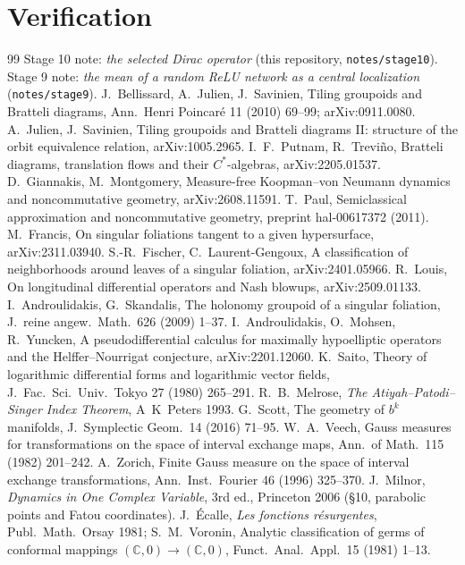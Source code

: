 \documentclass[11pt]{article}
\theoremstyle{plain}
\theoremstyle{definition}\newtheorem{definition}[theorem]{Definition}\newtheorem{remark}[theorem]{Remark}
\begin{document}
\section*{Verification}

\begin{thebibliography}{99}\small
{} Stage 10 note: \emph{the selected Dirac operator} (this repository, \texttt{notes/stage10}).
 Stage 9 note: \emph{the mean of a random ReLU network as a central localization} (\texttt{notes/stage9}).
 J.~Bellissard, A.~Julien, J.~Savinien, Tiling groupoids and Bratteli diagrams, Ann.~Henri Poincar\'e 11 (2010) 69--99; arXiv:0911.0080.
 A.~Julien, J.~Savinien, Tiling groupoids and Bratteli diagrams II: structure of the orbit equivalence relation, arXiv:1005.2965.
 I.~F.~Putnam, R.~Trevi\~no, Bratteli diagrams, translation flows and their $C^*$-algebras, arXiv:2205.01537.
 D.~Giannakis, M.~Montgomery, Measure-free Koopman--von Neumann dynamics and noncommutative geometry, arXiv:2608.11591.
 T.~Paul, Semiclassical approximation and noncommutative geometry, preprint hal-00617372 (2011).
 M.~Francis, On singular foliations tangent to a given hypersurface, arXiv:2311.03940.
 S.-R.~Fischer, C.~Laurent-Gengoux, A classification of neighborhoods around leaves of a singular foliation, arXiv:2401.05966.
 R.~Louis, On longitudinal differential operators and Nash blowups, arXiv:2509.01133.
 I.~Androulidakis, G.~Skandalis, The holonomy groupoid of a singular foliation, J.~reine angew.~Math.~626 (2009) 1--37.
 I.~Androulidakis, O.~Mohsen, R.~Yuncken, A pseudodifferential calculus for maximally hypoelliptic operators and the Helffer--Nourrigat conjecture, arXiv:2201.12060.
 K.~Saito, Theory of logarithmic differential forms and logarithmic vector fields, J.~Fac.~Sci.~Univ.~Tokyo 27 (1980) 265--291.
 R.~B.~Melrose, \emph{The Atiyah--Patodi--Singer Index Theorem}, A~K~Peters 1993.
 G.~Scott, The geometry of $b^k$ manifolds, J.~Symplectic Geom.~14 (2016) 71--95.
 W.~A.~Veech, Gauss measures for transformations on the space of interval exchange maps, Ann.~of Math.~115 (1982) 201--242.
 A.~Zorich, Finite Gauss measure on the space of interval exchange transformations, Ann.~Inst.~Fourier 46 (1996) 325--370.
 J.~Milnor, \emph{Dynamics in One Complex Variable}, 3rd ed., Princeton 2006 (\S10, parabolic points and Fatou coordinates).
 J.~\'Ecalle, \emph{Les fonctions r\'esurgentes}, Publ.~Math.~Orsay 1981; S.~M.~Voronin, Analytic classification of germs of conformal mappings $(\mathbb C,0)\to(\mathbb C,0)$, Funct.~Anal.~Appl.~15 (1981) 1--13.

\end{thebibliography}
\end{document}
